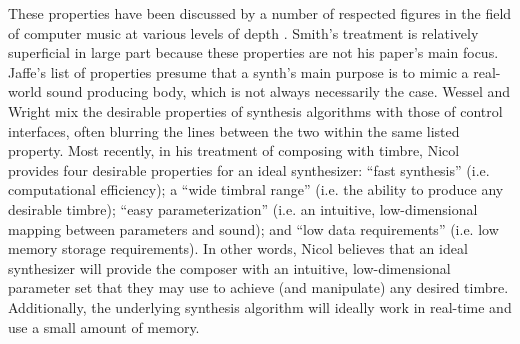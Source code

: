 \documentclass[a4paper,12pt]{report} 	%
\numberwithin{figure}{chapter}
\numberwithin{table}{chapter}
\numberwithin{equation}{chapter}
\begin{document}
\begin{flushleft}
These properties have been discussed by a number of respected figures in the field of computer music at various levels of depth \cite{III:1991hc, Wessel:2002uk, Jaffe:1995fv}. Smith's treatment is relatively superficial in large part because these properties are not his paper's main focus. Jaffe's list of properties presume that a synth's main purpose is to mimic a real-world sound producing body, which is not always necessarily the case. Wessel and Wright mix the desirable properties of synthesis algorithms with those of control interfaces, often blurring the lines between the two within the same listed property. Most recently, in his treatment of composing with timbre, Nicol \cite[p. 40]{Nicol:2005rp} provides four desirable properties for an ideal synthesizer: ``fast synthesis'' (i.e. computational efficiency); a ``wide timbral range'' (i.e. the ability to produce any desirable timbre); ``easy parameterization'' (i.e. an intuitive, low-dimensional mapping between parameters and sound); and ``low data requirements'' (i.e. low memory storage requirements). In other words, Nicol believes that an ideal synthesizer will provide the composer with an intuitive, low-dimensional parameter set that they may use to achieve (and manipulate) any desired timbre. Additionally, the underlying synthesis algorithm will ideally work in real-time and use a small amount of memory.


\end{flushleft}
\end{document}
